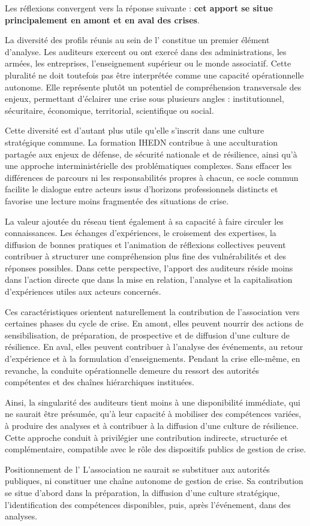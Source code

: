 Les réflexions convergent vers la réponse suivante : \textbf{cet apport se situe principalement en amont et en aval des crises}.

La diversité des profils réunis au sein de l'\ARSeize{} constitue un premier élément d'analyse. Les auditeurs exercent ou ont exercé dans des administrations, les armées, les entreprises, l'enseignement supérieur ou le monde associatif. Cette pluralité ne doit toutefois pas être interprétée comme une capacité opérationnelle autonome. Elle représente plutôt un potentiel de compréhension transversale des enjeux, permettant d'éclairer une crise sous plusieurs angles : institutionnel, sécuritaire, économique, territorial, scientifique ou social.

Cette diversité est d'autant plus utile qu'elle s'inscrit dans une culture stratégique commune. La formation IHEDN contribue à une acculturation partagée aux enjeux de défense, de sécurité nationale et de résilience, ainsi qu'à une approche interministérielle des problématiques complexes. Sans effacer les différences de parcours ni les responsabilités propres à chacun, ce socle commun facilite le dialogue entre acteurs issus d'horizons professionnels distincts et favorise une lecture moins fragmentée des situations de crise.

La valeur ajoutée du réseau tient également à sa capacité à faire circuler les connaissances. Les échanges d'expériences, le croisement des expertises, la diffusion de bonnes pratiques et l'animation de réflexions collectives peuvent contribuer à structurer une compréhension plus fine des vulnérabilités et des réponses possibles. Dans cette perspective, l'apport des auditeurs réside moins dans l'action directe que dans la mise en relation, l'analyse et la capitalisation d'expériences utiles aux acteurs concernés.

Ces caractéristiques orientent naturellement la contribution de l'association vers certaines phases du cycle de crise. En amont, elles peuvent nourrir des actions de sensibilisation, de préparation, de prospective et de diffusion d'une culture de résilience. En aval, elles peuvent contribuer à l'analyse des événements, au retour d'expérience et à la formulation d'enseignements. Pendant la crise elle-même, en revanche, la conduite opérationnelle demeure du ressort des autorités compétentes et des chaînes hiérarchiques instituées.

Ainsi, la singularité des auditeurs tient moins à une disponibilité immédiate, qui ne saurait être présumée, qu'à leur capacité à mobiliser des compétences variées, à produire des analyses et à contribuer à la diffusion d'une culture de résilience. Cette approche conduit à privilégier une contribution indirecte, structurée et complémentaire, compatible avec le rôle des dispositifs publics de gestion de crise.

\begin{proposition}{Positionnement de l'\ARSeize}
L'association ne saurait se substituer aux autorités publiques, ni constituer une chaîne autonome de gestion de crise. Sa contribution se situe d'abord dans la préparation, la diffusion d'une culture stratégique, l'identification des compétences disponibles, puis, après l'événement, dans des analyses.
\end{proposition}
